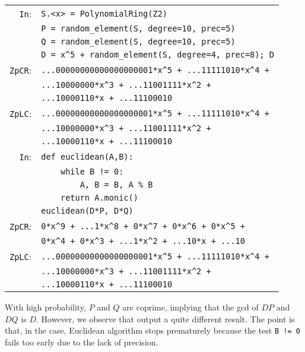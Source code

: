 \documentclass[sigconf]{acmart}
\newcommand{\ZpCR}{\text{\color{output} \rm \tt ZpCR}\xspace}
\newcommand{\cIn}{{\color{input} \tt \phantom{Zp}In}:}
\newcommand{\cZpCR}{{\color{output} \tt ZpCR}:}
\newcommand{\cZpLC}{{\color{output} \tt ZpLC}:}
\theoremstyle{definition}
\begin{document}
{\noindent \small
\begin{tabular}{@{}rl}
\cIn
 & \verb?S.<x> = ?{\color{constructor}\verb?PolynomialRing?}\verb?(?{\color{ring}\verb?Z2?}\verb?)? \\
 & \verb?P = ?{\color{function}\verb?random_element?}\verb?(S, degree=10, prec=5)? \\
 & \verb?Q = ?{\color{function}\verb?random_element?}\verb?(S, degree=10, prec=5)? \\
 & \verb?D = x^5 + ?{\color{function}\verb?random_element?}\verb?(S, degree=4, prec=8); D? \\
\cZpCR
 & \verb?...00000000000000000001*x^5 + ...11111010*x^4 +? \\ 
 & \verb?...10000000*x^3 + ...11001111*x^2 +? \\
 & \verb?...10000110*x + ...11100010? \\
\cZpLC
 & \verb?...00000000000000000001*x^5 + ...11111010*x^4 +? \\ 
 & \verb?...10000000*x^3 + ...11001111*x^2 +? \\
 & \verb?...10000110*x + ...11100010? \\
\cIn
 & {\color{keyword}\verb?def?}\verb? ?{\color{function}\verb?euclidean?}\verb?(A,B):? \\
 & \verb?    ?{\color{keyword}\verb?while?}\verb? B != 0:? \\
 & \verb?        A, B = B, A % B? \\
 & \verb?    ?{\color{keyword}\verb?return?}\verb? A.monic()? \\
 & {\color{function}\verb?euclidean?}\verb?(D*P, D*Q)? \\
\cZpCR
 & \verb?0*x^9 + ...1*x^8 + 0*x^7 + 0*x^6 + 0*x^5 +? \\
 & \verb?0*x^4 + 0*x^3 + ...1*x^2 + ...10*x + ...10? \\
\cZpLC
 & \verb?...00000000000000000001*x^5 + ...11111010*x^4 +? \\ 
 & \verb?...10000000*x^3 + ...11001111*x^2 +? \\
 & \verb?...10000110*x + ...11100010? \\
\end{tabular}}

\smallskip

\noindent
With high probability, $P$ and $Q$ are coprime, implying that the gcd of 
$DP$ and $DQ$ is $D$.  However, we observe that \ZpCR output a quite 
different result. The point is that, in the \ZpCR case, Euclidean 
algorithm stops prematurely because the test \verb?B != 0? fails 
too early due to the lack of precision.
\end{document}
